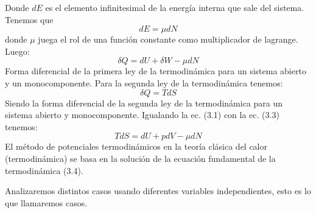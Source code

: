 Donde $dE$ es el elemento infinitesimal de la energía interna que sale del sistema.
Tenemos que $$dE=\mu dN$$ donde $\mu$ juega el rol de una función constante como multiplicador de lagrange.
Luego: \begin{equation}
    \delta Q= dU + \delta W -\mu dN \tag{3.2}
\end{equation}Forma diferencial de la primera ley de la termodinámica para un sistema abierto y un monocomponente.
Para la segunda ley de la termodinámica tenemos:
\begin{equation}
    \delta  Q =  TdS \tag{3.3}
\end{equation}Siendo la forma diferencial de la segunda ley de la termodinámica para un sistema abierto y monocomponente.
Igualando la ec. (3.1) con la ec. (3.3) tenemos:
\begin{equation}
    TdS  = dU + pdV - \mu dN \tag{3.4}
\end{equation}
El método de potenciales termodinámicos en la teoría clásica del calor  (termodinámica) se basa en la solución de la ecuación fundamental de la termodinámica (3.4).

Analizaremos distintos casos usando diferentes variables independientes, esto es lo que llamaremos casos.

